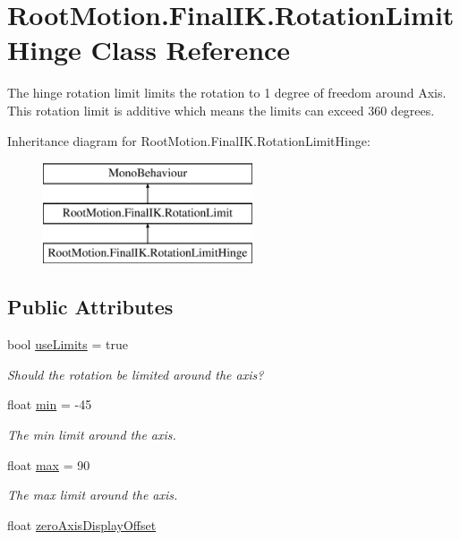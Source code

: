 \hypertarget{class_root_motion_1_1_final_i_k_1_1_rotation_limit_hinge}{}\section{Root\+Motion.\+Final\+I\+K.\+Rotation\+Limit\+Hinge Class Reference}
\label{class_root_motion_1_1_final_i_k_1_1_rotation_limit_hinge}


The hinge rotation limit limits the rotation to 1 degree of freedom around Axis. This rotation limit is additive which means the limits can exceed 360 degrees.  


Inheritance diagram for Root\+Motion.\+Final\+I\+K.\+Rotation\+Limit\+Hinge\+:\begin{figure}[H]
\begin{center}
\leavevmode
\includegraphics[height=3.000000cm]{class_root_motion_1_1_final_i_k_1_1_rotation_limit_hinge}
\end{center}
\end{figure}
\subsection*{Public Attributes}
\begin{DoxyCompactItemize}
\item 
bool \mbox{\hyperlink{class_root_motion_1_1_final_i_k_1_1_rotation_limit_hinge_acbbfed7196f956dd06e90728f5060598}{use\+Limits}} = true
\begin{DoxyCompactList}\small\item\em Should the rotation be limited around the axis? \end{DoxyCompactList}\item 
float \mbox{\hyperlink{class_root_motion_1_1_final_i_k_1_1_rotation_limit_hinge_a6ed350df6938f4c1eeac9eb4884ae7b7}{min}} = -\/45
\begin{DoxyCompactList}\small\item\em The min limit around the axis. \end{DoxyCompactList}\item 
float \mbox{\hyperlink{class_root_motion_1_1_final_i_k_1_1_rotation_limit_hinge_a57aced275c001a90534b93011c3b130a}{max}} = 90
\begin{DoxyCompactList}\small\item\em The max limit around the axis. \end{DoxyCompactList}\item 
float \mbox{\hyperlink{class_root_motion_1_1_final_i_k_1_1_rotation_limit_hinge_a85d1cbf4d100a00defcee3444d0f37c7}{zero\+Axis\+Display\+Offset}}
\end{DoxyCompactItemize}
